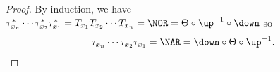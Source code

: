 \begin{proof}
By induction, we have $\tau_{x_n}^*\cdots \tau_{x_2}^* \tau_{x_1}^* = T_{x_1} T_{x_2} \cdots T_{x_n} = \NOR = \Theta\circ\up^{-1}\circ \down$ so
\[
\tau_{x_n}\cdots \tau_{x_2} \tau_{x_1} = \NAR
=\down\circ\Theta\circ\up^{-1}.\qedhere
\]
\end{proof}
